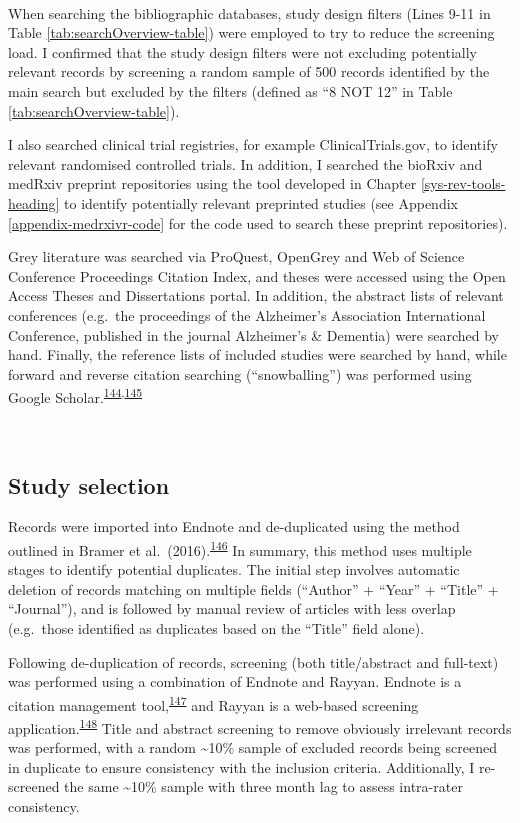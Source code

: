 \documentclass[a4paper, twoside]{templates/ociamthesis}
\begin{document}
~

When searching the bibliographic databases, study design filters (Lines 9-11 in Table \ref{tab:searchOverview-table}) were employed to try to reduce the screening load. I confirmed that the study design filters were not excluding potentially relevant records by screening a random sample of 500 records identified by the main search but excluded by the filters (defined as ``8 NOT 12'' in Table \ref{tab:searchOverview-table}).

I also searched clinical trial registries, for example ClinicalTrials.gov, to identify relevant randomised controlled trials. In addition, I searched the bioRxiv and medRxiv preprint repositories using the tool developed in Chapter \ref{sys-rev-tools-heading} to identify potentially relevant preprinted studies (see Appendix \ref{appendix-medrxivr-code} for the code used to search these preprint repositories).

Grey literature was searched via ProQuest, OpenGrey and Web of Science Conference Proceedings Citation Index, and theses were accessed using the Open Access Theses and Dissertations portal. In addition, the abstract lists of relevant conferences (e.g.~the proceedings of the Alzheimer's Association International Conference, published in the journal Alzheimer's \& Dementia) were searched by hand. Finally, the reference lists of included studies were searched by hand, while forward and reverse citation searching (``snowballing'') was performed using Google Scholar.\textsuperscript{\protect\hyperlink{ref-greenhalgh2005}{144},\protect\hyperlink{ref-wohlin2014}{145}}

~

\hypertarget{study-selection}{%
\subsection{Study selection}\label{study-selection}}

Records were imported into Endnote and de-duplicated using the method outlined in Bramer et al.~(2016).\textsuperscript{\protect\hyperlink{ref-bramer2016}{146}} In summary, this method uses multiple stages to identify potential duplicates. The initial step involves automatic deletion of records matching on multiple fields (``Author'' + ``Year'' + ``Title'' + ``Journal''), and is followed by manual review of articles with less overlap (e.g.~those identified as duplicates based on the ``Title'' field alone).

Following de-duplication of records, screening (both title/abstract and full-text) was performed using a combination of Endnote and Rayyan. Endnote is a citation management tool,\textsuperscript{\protect\hyperlink{ref-hupe2019}{147}} and Rayyan is a web-based screening application.\textsuperscript{\protect\hyperlink{ref-ouzzani2016}{148}} Title and abstract screening to remove obviously irrelevant records was performed, with a random \textasciitilde10\% sample of excluded records being screened in duplicate to ensure consistency with the inclusion criteria. Additionally, I re-screened the same \textasciitilde10\% sample with three month lag to assess intra-rater consistency.
\end{document}
